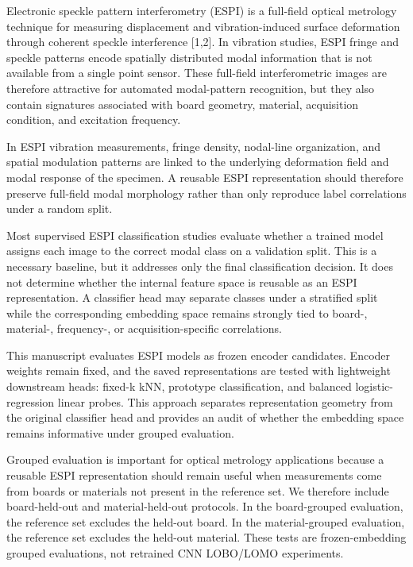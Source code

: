 \documentclass[review,3p,times]{elsarticle}
\begin{document}
Electronic speckle pattern interferometry (ESPI) is a full-field optical metrology technique for measuring displacement and vibration-induced surface deformation through coherent speckle interference [1,2]. In vibration studies, ESPI fringe and speckle patterns encode spatially distributed modal information that is not available from a single point sensor. These full-field interferometric images are therefore attractive for automated modal-pattern recognition, but they also contain signatures associated with board geometry, material, acquisition condition, and excitation frequency.

In ESPI vibration measurements, fringe density, nodal-line organization, and spatial modulation patterns are linked to the underlying deformation field and modal response of the specimen. A reusable ESPI representation should therefore preserve full-field modal morphology rather than only reproduce label correlations under a random split.

Most supervised ESPI classification studies evaluate whether a trained model assigns each image to the correct modal class on a validation split. This is a necessary baseline, but it addresses only the final classification decision. It does not determine whether the internal feature space is reusable as an ESPI representation. A classifier head may separate classes under a stratified split while the corresponding embedding space remains strongly tied to board-, material-, frequency-, or acquisition-specific correlations.

This manuscript evaluates ESPI models as frozen encoder candidates. Encoder weights remain fixed, and the saved representations are tested with lightweight downstream heads: fixed-k kNN, prototype classification, and balanced logistic-regression linear probes. This approach separates representation geometry from the original classifier head and provides an audit of whether the embedding space remains informative under grouped evaluation.

Grouped evaluation is important for optical metrology applications because a reusable ESPI representation should remain useful when measurements come from boards or materials not present in the reference set. We therefore include board-held-out and material-held-out protocols. In the board-grouped evaluation, the reference set excludes the held-out board. In the material-grouped evaluation, the reference set excludes the held-out material. These tests are frozen-embedding grouped evaluations, not retrained CNN LOBO/LOMO experiments.
\end{document}
